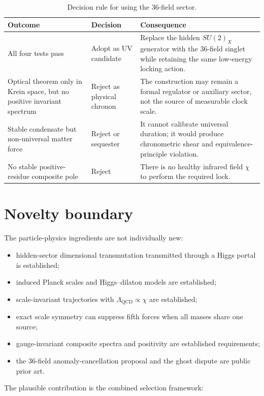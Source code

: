 \documentclass[11pt,a4paper]{article}
\newcommand{\QCD}{\mathrm{QCD}}
\begin{document}
\begin{table}[H]
\centering
\caption{Decision rule for using the 36-field sector.}
\begin{tabularx}{\textwidth}{@{}L{0.31\textwidth}L{0.18\textwidth}Y@{}}
\toprule
Outcome & Decision & Consequence \\
\midrule
All four tests pass & Adopt as UV candidate & Replace the hidden $SU(2)_X$ generator with the 36-field singlet while retaining the same low-energy locking action. \\
Optical theorem only in Krein space, but no positive invariant spectrum & Reject as physical chronon & The construction may remain a formal regulator or auxiliary sector, not the source of measurable clock scale. \\
Stable condensate but non-universal matter force & Reject or sequester & It cannot calibrate universal duration; it would produce chronometric shear and equivalence-principle violation. \\
No stable positive-residue composite pole & Reject & There is no healthy infrared field $\chi$ to perform the required lock. \\
\bottomrule
\end{tabularx}
\end{table}

\section{Novelty boundary}

The particle-physics ingredients are not individually new:

\begin{itemize}
  \item hidden-sector dimensional transmutation transmitted through a Higgs portal is established;
  \item induced Planck scales and Higgs--dilaton models are established;
  \item scale-invariant trajectories with $\Lambda_{\QCD}\propto\chi$ are established;
  \item exact scale symmetry can suppress fifth forces when all masses share one source;
  \item gauge-invariant composite spectra and positivity are established requirements;
  \item the 36-field anomaly-cancellation proposal and the ghost dispute are public prior art.
\end{itemize}

The plausible contribution is the combined selection framework:
\end{document}
